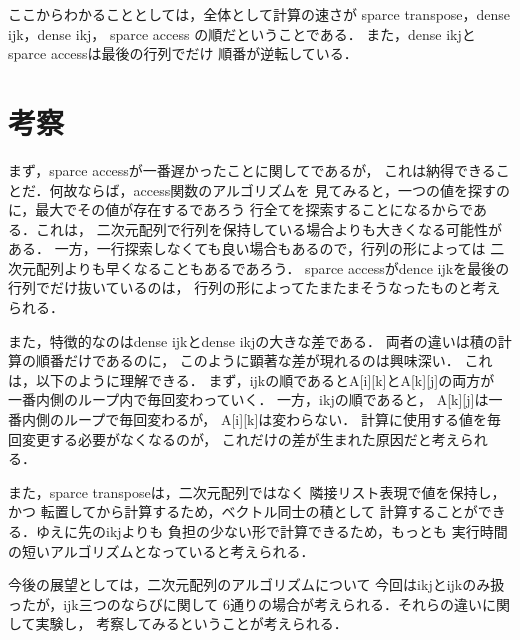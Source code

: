 \documentclass[11pt,a4paper]{jsarticle}
\begin{document}
ここからわかることとしては，全体として計算の速さが
sparce transpose，dense ijk，dense ikj，
sparce access
の順だということである．
また，dense ikjとsparce accessは最後の行列でだけ
順番が逆転している．

\section{考察}

まず，sparce accessが一番遅かったことに関してであるが，
これは納得できることだ．何故ならば，access関数のアルゴリズムを
見てみると，一つの値を探すのに，最大でその値が存在するであろう
行全てを探索することになるからである．これは，
二次元配列で行列を保持している場合よりも大きくなる可能性がある．
一方，一行探索しなくても良い場合もあるので，行列の形によっては
二次元配列よりも早くなることもあるであろう．
sparce accessがdence ijkを最後の行列でだけ抜いているのは，
行列の形によってたまたまそうなったものと考えられる．

また，特徴的なのはdense ijkとdense ikjの大きな差である．
両者の違いは積の計算の順番だけであるのに，
このように顕著な差が現れるのは興味深い．
これは，以下のように理解できる．
まず，ijkの順であるとA[i][k]とA[k][j]の両方が
一番内側のループ内で毎回変わっていく．
一方，ikjの順であると，
A[k][j]は一番内側のループで毎回変わるが，
A[i][k]は変わらない．
計算に使用する値を毎回変更する必要がなくなるのが，
これだけの差が生まれた原因だと考えられる．

また，sparce transposeは，二次元配列ではなく
隣接リスト表現で値を保持し，かつ
転置してから計算するため，ベクトル同士の積として
計算することができる．ゆえに先のikjよりも
負担の少ない形で計算できるため，もっとも
実行時間の短いアルゴリズムとなっていると考えられる．

今後の展望としては，二次元配列のアルゴリズムについて
今回はikjとijkのみ扱ったが，ijk三つのならびに関して
6通りの場合が考えられる．それらの違いに関して実験し，
考察してみるということが考えられる．
\end{document}
